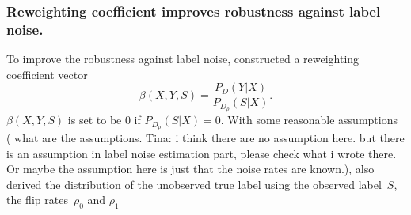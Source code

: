 \documentclass[12pt]{article} %
\begin{document}
\subsubsection{Reweighting coefficient improves robustness against label noise.}
To improve the robustness against label noise, \citet{liu2016classification} constructed a reweighting coefficient vector~
\begin{equation}
\beta(X,Y,S)=\frac{P_D(Y|X)}{P_{D_\rho}(S|X)}. \label{beta} 
\end{equation}
{\color{red} $\beta(X,Y,S)$ is set to be 0 if $P_{D_\rho}(S|X)=0$}. With some reasonable assumptions ({\color{red} what are the assumptions. Tina: i think there are no assumption here. but there is an assumption in label noise estimation part, please check what i wrote there. Or maybe the assumption here is just that the noise rates are known.}), \citet{liu2016classification} also derived the distribution of the unobserved  true label using the observed label~$S$, the flip rates~$\rho_{0}$ and $\rho_{1}$
\end{document}
